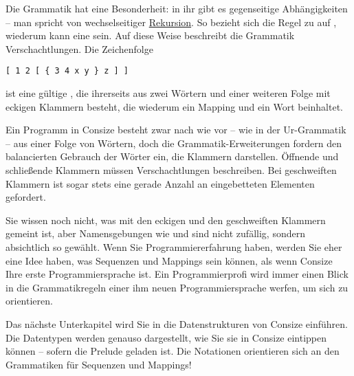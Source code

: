 Die Grammatik hat eine Besonderheit: in ihr gibt es gegenseitige Ab\-hän\-gig\-kei\-ten -- man spricht von wechselseitiger \href{http://de.wikipedia.org/wiki/Rekursion}{Rekursion}. So bezieht sich die Regel zu  auf ,  wiederum kann eine  sein. Auf diese Weise beschreibt die Grammatik Verschachtlungen. Die Zeichenfolge

\begin{verbatim}
[ 1 2 [ { 3 4 x y } z ] ]
\end{verbatim}

ist eine gültige , die ihrerseits aus zwei Wörtern und einer weiteren Folge mit eckigen Klammern besteht, die wiederum ein Mapping und ein Wort beinhaltet.

Ein Programm in Consize besteht zwar nach wie vor -- wie in der Ur-Grammatik -- aus einer Folge von Wörtern, doch die Grammatik-Er\-wei\-ter\-ungen fordern den balancierten Gebrauch der Wörter ein, die Klammern darstellen. Öffnende und schließende Klammern müssen Verschachtlungen beschreiben. Bei geschweiften Klammern ist sogar stets eine gerade Anzahl an eingebetteten Elementen gefordert.

%

Sie wissen noch nicht, was mit den eckigen und den geschweiften Klammern gemeint ist, aber Namensgebungen wie  und  sind nicht zufällig, sondern absichtlich so gewählt. Wenn Sie Programmiererfahrung haben, werden Sie eher eine Idee haben, was Sequenzen und Mappings sein können, als wenn Consize Ihre erste Programmiersprache ist. Ein Programmierprofi wird immer einen Blick in die Grammatikregeln einer ihm neuen Programmiersprache werfen, um sich zu orientieren.

Das nächste Unterkapitel wird Sie in die Datenstrukturen von Consize einführen. Die Datentypen werden genauso dargestellt, wie Sie sie in Consize eintippen können -- sofern die Prelude geladen ist. Die Notationen orientieren sich an den Grammatiken für Sequenzen und Mappings!


